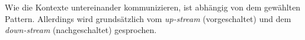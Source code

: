 
Wie die Kontexte untereinander kommunizieren, ist abhängig von dem gewählten Pattern. Allerdings wird grundsätzlich vom \textit{up-stream} (vorgeschaltet) und dem \textit{down-stream} (nachgeschaltet) gesprochen. 


